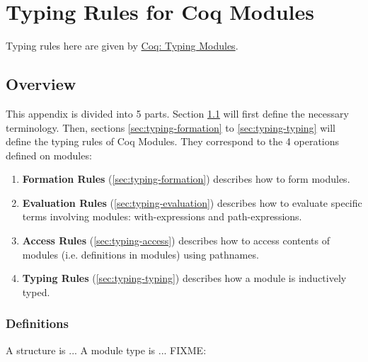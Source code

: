 \chapter{Typing Rules for Coq Modules}
\label{chap:typing}

\newcommand{\wf}[1]{\mathrm{WF}(#1)}
\newcommand{\struct}[1]{\text{Struct }#1\text{ End}}
\newcommand{\module}[1]{\text{Mod}(#1)}
\newcommand{\moda}[1]{\text{ModA}(#1)}
\newcommand{\modtype}[1]{\text{ModType}(#1)}
\newcommand{\with}{\text{ with }}
\newcommand{\range} %
[3]{{#1}_{#2};\ldots;{#1}_{#3}}

Typing rules here are given by
\href{https://coq.inria.fr/refman/language/core/modules.html#typing-modules}{Coq: Typing Modules}.

\section{Overview}
\label{sec:typing-overview}
This appendix is divided into 5 parts. Section \ref{sec:typing-overview} will
first define the necessary terminology. Then, sections \ref{sec:typing-formation}
to \ref{sec:typing-typing} will define the typing rules of Coq Modules. They
correspond to the 4 operations defined on modules:

\begin{enumerate}
\item \textbf{Formation Rules} (\ref{sec:typing-formation}) describes how to form
modules.
\item \textbf{Evaluation Rules} (\ref{sec:typing-evaluation}) describes how to
evaluate specific terms involving modules: with-expressions and path-expressions.
\item \textbf{Access Rules} (\ref{sec:typing-access}) describes how to access
contents of modules (i.e. definitions in modules) using pathnames.
\item \textbf{Typing Rules} (\ref{sec:typing-typing}) describes how a module is 
inductively typed.
\end{enumerate}

\subsection{Definitions}
\label{sec:typing-overview-definitions}
A structure is ...
A module type is ...
FIXME:
